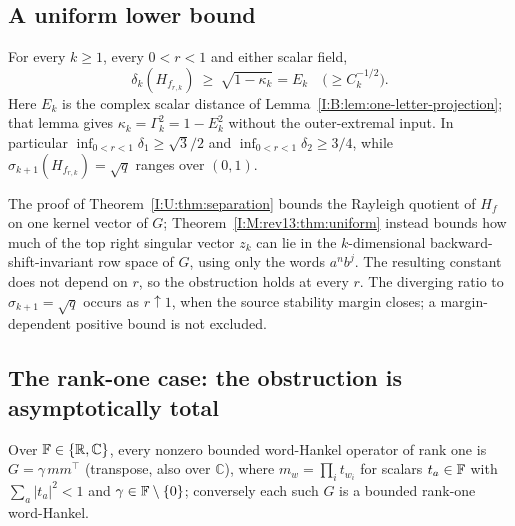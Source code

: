 \subsection{A uniform lower bound}
\begin{theorem}\label{I:M:rev13:thm:uniform}
For every $k\ge1$, every $0<r<1$ and either scalar field,
\[
\delta_k(H_{f_{r,k}})\ \ge\ \sqrt{1-\kappa_k}=E_k
\quad\bigl(\ge C_k^{-1/2}\bigr).
\]
Here $E_k$ is the complex scalar distance of
Lemma~\ref{I:B:lem:one-letter-projection}; that lemma gives
$\kappa_k=\Gamma_k^2=1-E_k^2$ without the outer-extremal input.
In particular $\inf_{0<r<1}\delta_1\ge\sqrt3/2$ and $\inf_{0<r<1}\delta_2\ge3/4$, while
$\sigma_{k+1}(H_{f_{r,k}})=\sqrt q$ ranges over $(0,1)$.
\end{theorem}


\begin{remark}
The proof of Theorem~\ref{I:U:thm:separation} bounds the Rayleigh quotient of $H_f$ on one kernel vector of $G$;
Theorem~\ref{I:M:rev13:thm:uniform} instead bounds how much of the top right singular vector $z_k$
can lie in the $k$-dimensional backward-shift-invariant row space of $G$, using only the
words $a^nb^j$. The resulting constant does not depend on $r$, so the obstruction holds at
every $r$. The diverging ratio to $\sigma_{k+1}=\sqrt q$ occurs as $r\uparrow1$, when the source stability margin closes; a margin-dependent positive bound is not excluded.\end{remark}

\subsection{The rank-one case: the obstruction is asymptotically total}
\begin{lemma}\label{I:M:rev13:lem:rank-one}\label{I:S:lem:rankone}
Over $\mathbb F\in\{\mathbb R,\mathbb C\}$, every nonzero bounded word-Hankel operator of rank one is
$G=\gamma\,mm^{\top}$ (transpose, also over $\mathbb C$), where
$m_w=\prod_{i}t_{w_i}$ for scalars $t_a\in\mathbb F$ with $\sum_a|t_a|^2<1$ and
$\gamma\in\mathbb F\setminus\{0\}$; conversely each such $G$ is a bounded rank-one word-Hankel.
\end{lemma}


